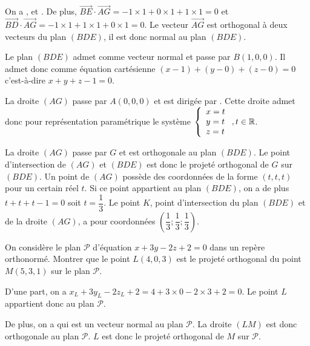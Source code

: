 \documentclass[11pt,fleqn, openany]{book} %
\begin{document}
\begin{solution}On a ,  et . De plus, $\overrightarrow{BE}\cdot \overrightarrow{AG}=-1 \times 1 + 0 \times 1 + 1 \times 1 = 0$ et $\overrightarrow{BD}\cdot \overrightarrow{AG}=-1 \times 1 + 1 \times 1 + 0 \times 1 = 0$. Le vecteur $\overrightarrow{AG}$ est orthogonal à deux vecteurs du plan $(BDE)$, il est donc normal au plan $(BDE)$.

Le plan $(BDE)$ admet  comme vecteur normal et passe par $B(1,0,0)$. Il admet donc comme équation cartésienne $(x-1)+(y-0)+(z-0)=0$ c'est-à-dire $x+y+z-1=0$.

 La droite $(AG)$ passe par $A(0,0,0)$ et est dirigée par . Cette droite admet donc pour représentation paramétrique le système $\left\{ \renewcommand{\arraystretch}{1}\renewcommand{\arraystretch}{1}\begin{array}{l}x=t \\ y=t \\ z = t \\
\end{array}\right., t \in \mathbb{R}$.

La droite $(AG)$ passe par $G$ et est orthogonale au plan $(BDE)$. Le point d'intersection de $(AG)$ et $(BDE)$ est donc le projeté orthogonal de $G$ sur $(BDE)$. Un point de $(AG)$ possède des coordonnées de la forme $(t,t,t)$ pour un certain réel $t$. Si ce point appartient au plan $(BDE)$, on a de plus $t+t+t-1=0$ soit $t=\dfrac{1}{3}$. Le point $K$, point d'intersection du plan $(BDE)$ et de la droite $(AG)$, a pour coordonnées $\left(\dfrac{1}{3};\dfrac{1}{3};\dfrac{1}{3}\right)$.\end{solution}



\begin{exercise}[topic=geom15, subtitle={(Amérique du nord 2021)}] On considère le plan $\mathcal{P}$ d'équation $x+3y-2z+2=0$ dans un repère orthonormé. Montrer que le point $L(4, 0, 3)$ est le projeté orthogonal du point $M(5, 3, 1)$ sur le plan $\mathcal{P}$.\newpage \end{exercise}

\begin{solution}D'une part, on a $x_L+3y_L-2z_L+2=4+3\times 0-2\times 3+2=0$. Le point $L$ appartient donc au plan $\mathcal{P}$.

De plus, on a  qui est un vecteur normal au plan $\mathcal{P}$. La droite $(LM)$ est donc orthogonale au plan $\mathcal{P}$. $L$ est donc le projeté orthogonal de $M$ sur $\mathcal{P}$.\end{solution}
\end{document}
